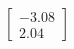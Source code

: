 \documentclass[preview]{standalone}
\begin{document}
\begin{align*}
\begin{bmatrix} -3.08 \\ 2.04 \end{bmatrix}
\end{align*}
\end{document}
